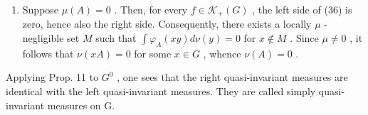 \begin{enumerate}
\def\labelenumi{\alph{enumi})}
\setcounter{enumi}{2}
\tightlist
\item
  Suppose \(\mu(A) = 0\) . Then, for every \(f \in \mathcal{K}_{+}(G)\) , the left side of (36) is zero, hence also the right side. Consequently, there exists a locally \(\mu\) -negligible set \(M\) such that \(\int \varphi_{A}(xy) d\nu(y) = 0\) for \(x \notin M\) . Since \(\mu \neq 0\) , it follows that \(\nu(xA) = 0\) for some \(x \in G\) , whence \(\nu(A) = 0\) .
\end{enumerate}

Applying Prop. 11 to \(G^{0}\) , one sees that the right quasi-invariant measures are identical with the left quasi-invariant measures. They are called simply quasi-invariant measures on G.

